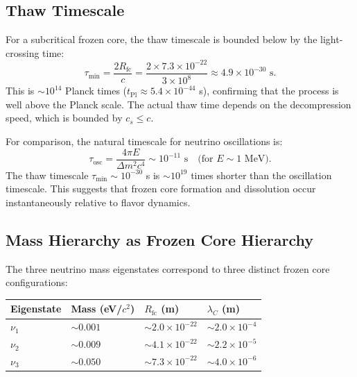 \documentclass[11pt,a4paper]{article}
\newcommand{\tPl}{\ensuremath{t_{\mathrm{Pl}}}}
\newcommand{\Rfc}{\ensuremath{R_{\mathrm{fc}}}}
\theoremstyle{definition}
\theoremstyle{remark}
\begin{document}
\subsection{Thaw Timescale}
\label{sec:neutrino_timescale}

For a subcritical frozen core, the thaw timescale is bounded below by the light-crossing time:
\begin{equation}
\tau_{\min} = \frac{2\Rfc}{c} = \frac{2 \times 7.3 \times 10^{-22}}{3 \times 10^8} \approx 4.9 \times 10^{-30} \text{ s}.
\end{equation}
This is $\sim 10^{14}$ Planck times ($\tPl \approx 5.4 \times 10^{-44}$ s), confirming that the process is well above the Planck scale. The actual thaw time depends on the decompression speed, which is bounded by $c_s \leq c$.

\vspace{0.5em}
\noindent
For comparison, the natural timescale for neutrino oscillations is:
\begin{equation}
\tau_{\mathrm{osc}} = \frac{4\pi E}{\Delta m^2 c^4} \sim 10^{-11} \text{ s} \quad \text{(for $E \sim 1$ MeV)}.
\end{equation}
The thaw timescale $\tau_{\min} \sim 10^{-30}$ s is $\sim 10^{19}$ times shorter than the oscillation timescale. This suggests that frozen core formation and dissolution occur instantaneously relative to flavor dynamics.

\subsection{Mass Hierarchy as Frozen Core Hierarchy}
\label{sec:mass_hierarchy}

The three neutrino mass eigenstates correspond to three distinct frozen core configurations:
\begin{center}
\begin{tabular}{llll}
\toprule
\textbf{Eigenstate} & \textbf{Mass (eV/$c^2$)} & \textbf{$\Rfc$ (m)} & \textbf{$\lambda_C$ (m)} \\
\midrule
$\nu_1$ & $\sim 0.001$ & $\sim 2.0 \times 10^{-22}$ & $\sim 2.0 \times 10^{-4}$ \\
$\nu_2$ & $\sim 0.009$ & $\sim 4.1 \times 10^{-22}$ & $\sim 2.2 \times 10^{-5}$ \\
$\nu_3$ & $\sim 0.050$ & $\sim 7.3 \times 10^{-22}$ & $\sim 4.0 \times 10^{-6}$ \\
\bottomrule
\end{tabular}
\end{center}
\end{document}
